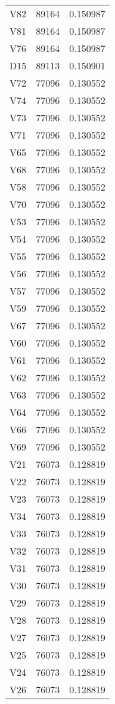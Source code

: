 \begin{tabular}{lrr}
V82 & 89164 & 0.150987 \\
V81 & 89164 & 0.150987 \\
V76 & 89164 & 0.150987 \\
D15 & 89113 & 0.150901 \\
V72 & 77096 & 0.130552 \\
V74 & 77096 & 0.130552 \\
V73 & 77096 & 0.130552 \\
V71 & 77096 & 0.130552 \\
V65 & 77096 & 0.130552 \\
V68 & 77096 & 0.130552 \\
V58 & 77096 & 0.130552 \\
V70 & 77096 & 0.130552 \\
V53 & 77096 & 0.130552 \\
V54 & 77096 & 0.130552 \\
V55 & 77096 & 0.130552 \\
V56 & 77096 & 0.130552 \\
V57 & 77096 & 0.130552 \\
V59 & 77096 & 0.130552 \\
V67 & 77096 & 0.130552 \\
V60 & 77096 & 0.130552 \\
V61 & 77096 & 0.130552 \\
V62 & 77096 & 0.130552 \\
V63 & 77096 & 0.130552 \\
V64 & 77096 & 0.130552 \\
V66 & 77096 & 0.130552 \\
V69 & 77096 & 0.130552 \\
V21 & 76073 & 0.128819 \\
V22 & 76073 & 0.128819 \\
V23 & 76073 & 0.128819 \\
V34 & 76073 & 0.128819 \\
V33 & 76073 & 0.128819 \\
V32 & 76073 & 0.128819 \\
V31 & 76073 & 0.128819 \\
V30 & 76073 & 0.128819 \\
V29 & 76073 & 0.128819 \\
V28 & 76073 & 0.128819 \\
V27 & 76073 & 0.128819 \\
V25 & 76073 & 0.128819 \\
V24 & 76073 & 0.128819 \\
V26 & 76073 & 0.128819 \\

\end{tabular}
